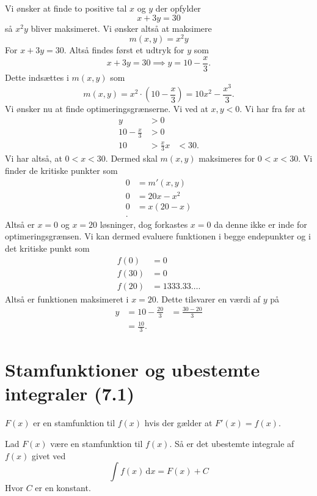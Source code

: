 \begin{eks} 
  Vi ønsker at finde to positive tal $x$ og $y$ der opfylder
  \[ 
  x + 3y = 30
  \]
  så $x^2y$ bliver maksimeret.
  \bigbreak
  Vi ønsker altså at maksimere
  \[ 
  m(x,y) = x^2y
  \]
  For $x+3y = 30$. Altså findes først et udtryk for $y$ som
  \[ 
  x + 3y = 30 \implies y = 10 - \frac{x}{3}
  .\]
  Dette indsættes i $m(x,y)$ som
  \[ 
  m(x,y) = x^2 \cdot \left( 10 - \frac{x}{3} \right) = 10x^2 - \frac{x^3}{3}
  .\]
  Vi ønsker nu at finde optimeringsgrænserne. Vi ved at $x, y < 0$. Vi har fra før at
  \begin{align*}
    y &> 0 \\
    10 - \frac{x}{3} &> 0 \\
    10 &> \frac{x}{3}
    x &< 30
  .\end{align*}
  Vi har altså, at $0 < x < 30$. Dermed skal $m(x,y)$ maksimeres for $0 < x < 30$. Vi finder de kritiske punkter som
  \begin{align*}
    0 &= m'(x,y) \\
    0 &= 20x - x^2 \\
    0 &= x(20 - x) \\
  .\end{align*}
  Altså er $x = 0$ og $x = 20$ løsninger, dog forkastes $x = 0$ da denne ikke er inde for optimeringsgrænsen. Vi kan dermed evaluere funktionen i begge endepunkter og i det kritiske punkt som
  \begin{align*}
    f(0) &= 0 \\
    f(30) &= 0 \\
    f(20) &= \num{1333,33}\ldots  
  .\end{align*}
  Altså er funktionen maksimeret i $x = 20$. Dette tilsvarer en værdi af $y$ på
  \begin{align*}
    y &= 10 - \frac{20}{3}
    &= \frac{30-20}{3} \\
    &= \frac{10}{3}
  .\end{align*}
\end{eks}

\section{Stamfunktioner og ubestemte integraler (7.1)}
\begin{definition} [Stamfunktion]
  $F(x)$ er en stamfunktion til $f(x)$ hvis der gælder at $F'(x) = f(x)$.
\end{definition}

\begin{definition} 
  Lad $F(x)$ være en stamfunktion til $f(x)$. Så er det ubestemte integrale af $f(x)$ givet ved
  \[ 
  \int f(x) \, \mathrm{d}x  = F(x) + C
  \]
  Hvor $C$ er en konstant.
\end{definition}
